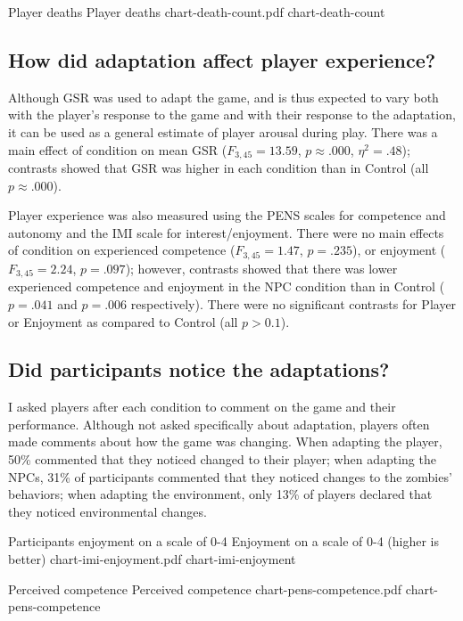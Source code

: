 \img
{Player deaths}
{Player deaths}
{chart-death-count.pdf}
{chart-death-count}

\subsection{How did adaptation affect player experience?}

Although GSR was used to adapt the game, and is thus expected to vary both with the player's response to the game and with their response to the adaptation, it can be used as a general estimate of player arousal during play. There was a main effect of condition on mean GSR ($F_{3,45} = 13.59$, $p \approx .000$, $\eta^{2} = .48$); contrasts showed that GSR was higher in each condition than in Control (all $p \approx .000$).

Player experience was also measured using the PENS scales for competence and autonomy and the IMI scale for interest/enjoyment. There were no main effects of condition on experienced competence ($F_{3,45} = 1.47$, $p = .235$), or enjoyment ($F_{3,45} = 2.24$, $p = .097$); however, contrasts showed that there was lower experienced competence and enjoyment in the NPC condition than in Control ($p = .041$ and $p = .006$ respectively). There were no significant contrasts for Player or Enjoyment as compared to Control (all $p > 0.1$).

\subsection{Did participants notice the adaptations?}

I asked players after each condition to comment on the game and their performance. Although not asked specifically about adaptation, players often made comments about how the game was changing. When adapting the player, 50\% commented that they noticed changed to their player; when adapting the NPCs, 31\% of participants commented that they noticed changes to the zombies' behaviors; when adapting the environment, only 13\% of players declared that they noticed environmental changes.


\img
{Participants enjoyment on a scale of 0-4}
{Enjoyment on a scale of 0-4 (higher is better)}
{chart-imi-enjoyment.pdf}
{chart-imi-enjoyment}

\img
{Perceived competence}
{Perceived competence}
{chart-pens-competence.pdf}
{chart-pens-competence}

